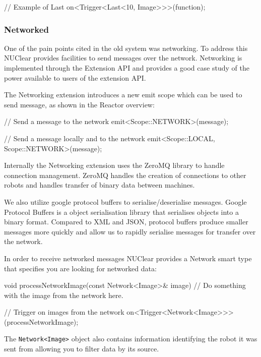 \documentclass[english,12pt]{scrartcl}
\begin{document}
				\begin{cppcode}
				// Example of Last
				on<Trigger<Last<10, Image>>>(function);
				\end{cppcode}
	
			\subsubsection{Networked}
				One of the pain points cited in the old system was networking. 
				To address this NUClear provides facilities to send messages over the network.
				Networking is implemented through the Extension API and provides a good case study of the power available to users of the extension API.
				
				The Networking extension introduces a new emit scope which can be used to send message, as shown in the Reactor overview:
				
				\begin{cppcode}
					// Send a message to the network
					emit<Scope::NETWORK>(message);
					
					// Send a message locally and to the network
					emit<Scope::LOCAL, Scope::NETWORK>(message);
				\end{cppcode}
				
				Internally the Networking extension uses the ZeroMQ library to handle connection management.
				ZeroMQ handles the creation of connections to other robots and handles transfer of binary data between machines.
				
				We also utilize google protocol buffers to serialise/deserialise messages. 
				Google Protocol Buffers is a object serialisation library that serialises objects into a binary format.
				Compared to XML and JSON, protocol buffers produce smaller messages more quickly and allow us to rapidly serialise messages for transfer over the network.
				
				In order to receive networked messages NUClear provides a Network smart type that specifies you are looking for networked data:
				
				\begin{cppcode}
					void processNetworkImage(const Network<Image>& image) {
					    // Do something with the image from the network here.
					}
					
					// Trigger on images from the network
					on<Trigger<Network<Image>>>(processNetworkImage);
				\end{cppcode}
				
				The \texttt{Network<Image>} object also contains information identifying the robot it was sent from allowing you to filter data by its source.
				
\end{document}
